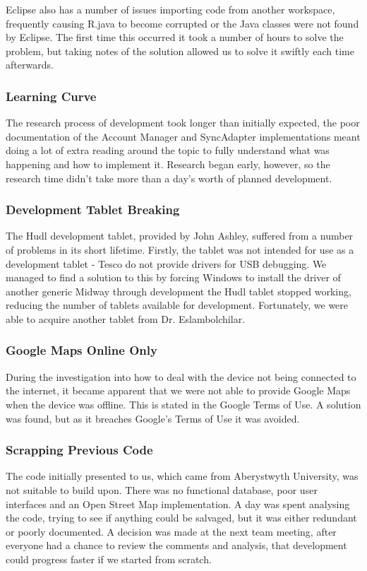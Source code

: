 \documentclass[11pt,a4paper]{report}
\begin{document}
Eclipse also has a number of issues importing code from another workspace, frequently causing R.java to become corrupted or the Java classes were not found by Eclipse. The first time this occurred it took a number of hours to solve the problem, but taking notes of the solution allowed us to solve it swiftly each time afterwards.

\subsubsection{Learning Curve}
The research process of development took longer than initially expected, the poor documentation of the Account Manager and SyncAdapter implementations meant doing a lot of extra reading around the topic to fully understand what was happening and how to implement it. Research began early, however, so the research time didn't take more than a day's worth of planned development.

\subsubsection{Development Tablet Breaking}
The Hudl development tablet, provided by John Ashley, suffered from a number of problems in its short lifetime. Firstly, the tablet was not intended for use as a development tablet - Tesco do not provide drivers for USB debugging. We managed to find a solution to this by forcing Windows to install the driver of another generic 
Midway through development the Hudl tablet stopped working, reducing the number of tablets available for development. Fortunately, we were able to acquire another tablet from Dr. Eslambolchilar.

\subsubsection{Google Maps Online Only}
During the investigation into how to deal with the device not being connected to the internet, it became apparent that we were not able to provide Google Maps when the device was offline. This is stated in the Google Terms of Use. A solution was found, but as it breaches Google's Terms of Use it was avoided.

\subsubsection{Scrapping Previous Code}
The code initially presented to us, which came from Aberystwyth University, was not suitable to build upon. There was no functional database, poor user interfaces and an Open Street Map implementation. A day was spent analysing the code, trying to see if anything could be salvaged, but it was either redundant or poorly documented. A decision was made at the next team meeting, after everyone had a chance to review the comments and analysis, that development could progress faster if we started from scratch.
\end{document}

